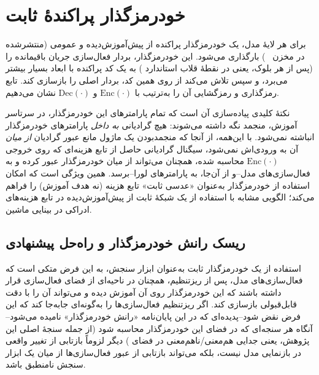 \section{خودرمزگذار پراکندهٔ ثابت}
\label{sec:sae}
برای هر لایهٔ مدل، یک خودرمزگذار پراکنده
از پیش‌آموزش‌دیده و عمومی (منتشرشده در مخزن
~\cite{bloom2024saelens}) بارگذاری می‌شود. این خودرمزگذار، بردار فعال‌سازی جریان باقیمانده را (پس از هر بلوک، یعنی در نقطهٔ قلاب استاندارد
) به یک کد پراکنده با ابعاد بسیار بیشتر می‌برد، و سپس تلاش می‌کند از روی همین کد، بردار اصلی را بازسازی کند. تابع رمزگذاری و رمزگشایی آن را به‌ترتیب با
$\mathrm{Enc}(\cdot)$
و
$\mathrm{Dec}(\cdot)$
نشان می‌دهیم.

نکتهٔ کلیدی پیاده‌سازی آن است که تمام پارامترهای این خودرمزگذار، در سرتاسر آموزش، منجمد نگه داشته می‌شوند: هیچ گرادیانی \emph{به داخل} پارامترهای خودرمزگذار انباشته نمی‌شود. با این‌همه، از آنجا که منجمدبودن یک ماژول مانع عبور گرادیان \emph{از میان} آن به ورودی‌اش نمی‌شود، سیگنال گرادیانی حاصل از تابع هزینه‌ای که روی خروجی
$\mathrm{Enc}(\cdot)$
محاسبه شده، همچنان می‌تواند از میان خودرمزگذار عبور کرده و به فعال‌سازی‌های مدل--و از آن‌جا، به پارامترهای لورا--برسد. همین ویژگی است که امکان استفاده از خودرمزگذار به‌عنوان «عدسی ثابت» تابع هزینه (نه هدف آموزش) را فراهم می‌کند؛ الگویی مشابه با استفاده از یک شبکهٔ ثابت از پیش‌آموزش‌دیده در تابع هزینه‌های ادراکی
در بینایی ماشین.

\subsection{ریسک رانش خودرمزگذار و راه‌حل پیشنهادی}
\label{sec:sae-drift}
استفاده از یک خودرمزگذار ثابت به‌عنوان ابزار سنجش، به این فرض متکی است که فعال‌سازی‌های مدل، پس از ریزتنظیم، همچنان در ناحیه‌ای از فضای فعال‌سازی قرار داشته باشند که این خودرمزگذار روی آن آموزش دیده و می‌تواند آن را با دقت قابل‌قبولی بازسازی کند. اگر ریزتنظیم فعال‌سازی‌ها را به‌گونه‌ای جابه‌جا کند که این فرض نقض شود--پدیده‌ای که در این پایان‌نامه «رانش خودرمزگذار»
نامیده می‌شود--آنگاه هر سنجه‌ای که در فضای این خودرمزگذار محاسبه شود (از جمله سنجهٔ اصلی این پژوهش، یعنی جدایی هم‌معنی/ناهم‌معنی در فضای
) دیگر لزوماً بازتابی از تغییر واقعی در بازنمایی مدل نیست، بلکه می‌تواند بازتابی از عبور فعال‌سازی‌ها از میان یک ابزار سنجش نامنطبق باشد.

